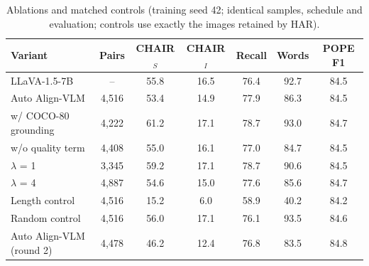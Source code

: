 \begin{table}[t]
\centering
\small
\caption{Ablations and matched controls (training seed 42; identical samples, schedule and evaluation; controls use exactly the images retained by HAR).}
\label{tab:ablations}
\begin{tabular}{lcccccc}
\toprule
Variant & Pairs & CHAIR$_S$ & CHAIR$_I$ & Recall & Words & POPE F1 \\
\midrule
LLaVA-1.5-7B & -- & 55.8 & 16.5 & 76.4 & 92.7 & 84.5 \\
\midrule
Auto Align-VLM & 4,516 & 53.4 & 14.9 & 77.9 & 86.3 & 84.5 \\
w/ COCO-80 grounding & 4,222 & 61.2 & 17.1 & 78.7 & 93.0 & 84.7 \\
w/o quality term & 4,408 & 55.0 & 16.1 & 77.0 & 84.7 & 84.5 \\
$\lambda$ = 1 & 3,345 & 59.2 & 17.1 & 78.7 & 90.6 & 84.5 \\
$\lambda$ = 4 & 4,887 & 54.6 & 15.0 & 77.6 & 85.6 & 84.7 \\
Length control & 4,516 & 15.2 & 6.0 & 58.9 & 40.2 & 84.2 \\
Random control & 4,516 & 56.0 & 17.1 & 76.1 & 93.5 & 84.6 \\
Auto Align-VLM (round 2) & 4,478 & 46.2 & 12.4 & 76.8 & 83.5 & 84.8 \\
\bottomrule
\end{tabular}
\end{table}
